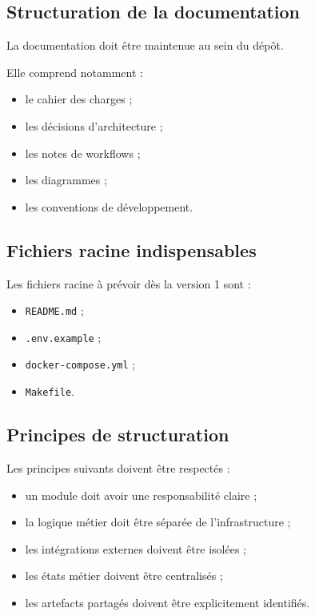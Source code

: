 \documentclass[11pt,a4paper]{article}
\begin{document}
\subsection{Structuration de la documentation}

La documentation doit être maintenue au sein du dépôt.

Elle comprend notamment :

\begin{itemize}
    \item le cahier des charges ;
    \item les décisions d’architecture ;
    \item les notes de workflows ;
    \item les diagrammes ;
    \item les conventions de développement.
\end{itemize}

\subsection{Fichiers racine indispensables}

Les fichiers racine à prévoir dès la version 1 sont :

\begin{itemize}
    \item \texttt{README.md} ;
    \item \texttt{.env.example} ;
    \item \texttt{docker-compose.yml} ;
    \item \texttt{Makefile}.
\end{itemize}

\subsection{Principes de structuration}

Les principes suivants doivent être respectés :

\begin{itemize}
    \item un module doit avoir une responsabilité claire ;
    \item la logique métier doit être séparée de l’infrastructure ;
    \item les intégrations externes doivent être isolées ;
    \item les états métier doivent être centralisés ;
    \item les artefacts partagés doivent être explicitement identifiés.
\end{itemize}
\end{document}
